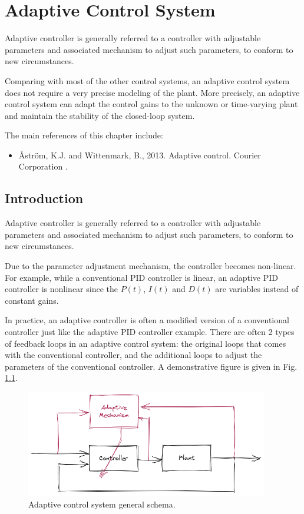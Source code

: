 \chapter{Adaptive Control System} \label{ch:acs}

Adaptive controller is generally referred to a controller with adjustable parameters and associated mechanism to adjust such parameters, to conform to new circumstances.

Comparing with most of the other control systems, an adaptive control system does not require a very precise modeling of the plant. More precisely, an adaptive control system can adapt the control gains to the unknown or time-varying plant and maintain the stability of the closed-loop system.

The main references of this chapter include:
\begin{itemize}
	\item Åström, K.J. and Wittenmark, B., 2013. Adaptive control. Courier Corporation \cite{aastrom2013adaptive}.
\end{itemize}

\section{Introduction}

Adaptive controller is generally referred to a controller with adjustable parameters and associated mechanism to adjust such parameters, to conform to new circumstances.

Due to the parameter adjustment mechanism, the controller becomes non-linear. For example, while a conventional PID controller is linear, an adaptive PID controller is nonlinear since the $P(t)$, $I(t)$ and $D(t)$ are variables instead of constant gains.

In practice, an adaptive controller is often a modified version of a conventional controller just like the adaptive PID controller example. There are often 2 types of feedback loops in an adaptive control system: the original loops that comes with the conventional controller, and the additional loops to adjust the parameters of the conventional controller. A demonstrative figure is given in Fig. \ref{ch:acs:fig:adaptive_control_schema_general}.

\begin{figure}
	\centering
	\includegraphics[width=300pt]{chapters/ch-adaptive-control-system/figures/adaptive_control_schema_general.png}
	\caption{Adaptive control system general schema.} \label{ch:acs:fig:adaptive_control_schema_general}
\end{figure}

